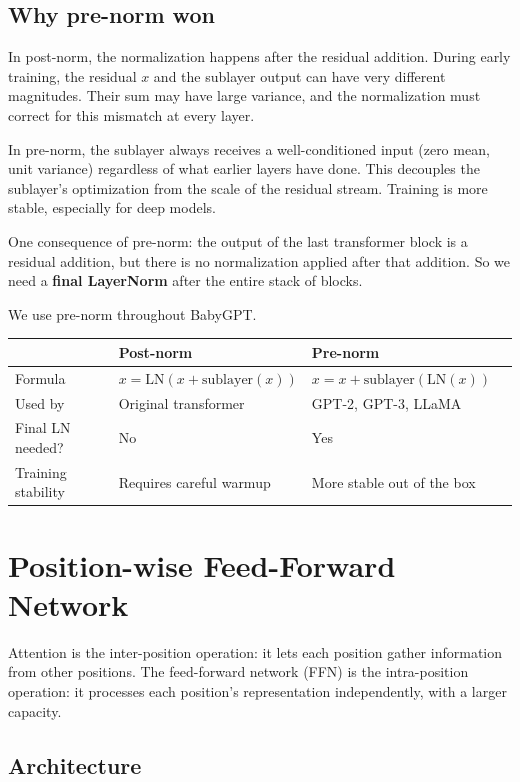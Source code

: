 \subsection{Why pre-norm won}

In post-norm, the normalization happens after the residual addition. During early training, the residual $x$ and the sublayer output can have very different magnitudes. Their sum may have large variance, and the normalization must correct for this mismatch at every layer.

In pre-norm, the sublayer always receives a well-conditioned input (zero mean, unit variance) regardless of what earlier layers have done. This decouples the sublayer's optimization from the scale of the residual stream. Training is more stable, especially for deep models.

One consequence of pre-norm: the output of the last transformer block is a residual addition, but there is no normalization applied after that addition. So we need a \textbf{final LayerNorm} after the entire stack of blocks.

We use pre-norm throughout BabyGPT.

\begin{tabular}{llll}
\toprule
 & Post-norm & Pre-norm \\
\midrule
Formula & $x = \mathrm{LN}(x + \mathrm{sublayer}(x))$ & $x = x + \mathrm{sublayer}(\mathrm{LN}(x))$ \\
Used by & Original transformer & GPT-2, GPT-3, LLaMA \\
Final LN needed? & No & Yes \\
Training stability & Requires careful warmup & More stable out of the box \\
\bottomrule
\end{tabular}

\section{Position-wise Feed-Forward Network}

Attention is the inter-position operation: it lets each position gather information from other positions. The feed-forward network (FFN) is the intra-position operation: it processes each position's representation independently, with a larger capacity.

\subsection{Architecture}

